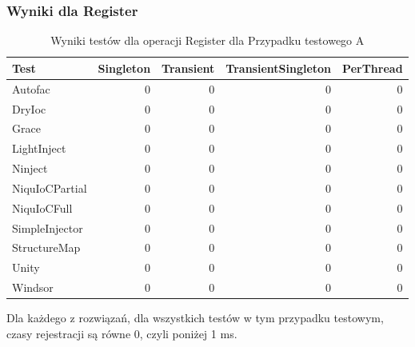 \documentclass[12pt]{article}
\begin{document}
\subsubsection{Wyniki dla Register}
\begin{table}[H]
\captionsetup{belowskip=0pt,aboveskip=0pt}
\begin{center}
\begin{small}
	\begin{tabular}{ | l | r | r | r | r | }
    		\hline
Test & Singleton & Transient & TransientSingleton & PerThread \\ \hline
Autofac & 0 & 0 & 0 & 0 \\ \hline
DryIoc & 0 & 0 & 0 & 0 \\ \hline
Grace & 0 & 0 & 0 & 0 \\ \hline
LightInject & 0 & 0 & 0 & 0 \\ \hline
Ninject & 0 & 0 & 0 & 0 \\ \hline
NiquIoCPartial & 0 & 0 & 0 & 0 \\ \hline
NiquIoCFull & 0 & 0 & 0 & 0 \\ \hline
SimpleInjector & 0 & 0 & 0 & 0 \\ \hline
StructureMap & 0 & 0 & 0 & 0 \\ \hline
Unity & 0 & 0 & 0 & 0 \\ \hline
Windsor & 0 & 0 & 0 & 0 \\ \hline
  	\end{tabular}
\end{small}
\end{center}
\caption{Wyniki testów dla operacji Register dla Przypadku testowego A}
\label{TestCaseA_Register}
\end{table}
Dla każdego z rozwiązań, dla wszystkich testów w tym przypadku testowym, czasy rejestracji są równe 0, czyli poniżej 1 ms.
\end{document}
